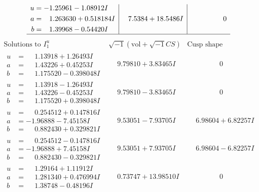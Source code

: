 \documentclass[1p]{elsarticle_modified}
\theoremstyle{definition}
\newcommand{\I}{\sqrt{-1}}
\begin{document}
$$\begin{array}{c|c|c}
\begin{aligned}
u &= -1.25961 - 1.08912 I \\
a &= \phantom{-}1.263630 + 0.518184 I \\
b &= \phantom{-}1.39968 - 0.54420 I\end{aligned}
 & \phantom{-}7.5384 + 18.5486 I & \phantom{-0.000000 } 0\\
 \hline 
 \end{array}$$\newpage$$\begin{array}{c|c|c}  
\text{Solutions to }I^u_{1}& \I (\text{vol} + \sqrt{-1}CS) & \text{Cusp shape}\\
 \hline 
\begin{aligned}
u &= \phantom{-}1.13918 + 1.26493 I \\
a &= \phantom{-}1.43226 + 0.45253 I \\
b &= \phantom{-}1.175520 - 0.398048 I\end{aligned}
 & \phantom{-}9.79810 + 3.83465 I & \phantom{-0.000000 } 0 \\ \hline\begin{aligned}
u &= \phantom{-}1.13918 - 1.26493 I \\
a &= \phantom{-}1.43226 - 0.45253 I \\
b &= \phantom{-}1.175520 + 0.398048 I\end{aligned}
 & \phantom{-}9.79810 - 3.83465 I & \phantom{-0.000000 } 0 \\ \hline\begin{aligned}
u &= \phantom{-}0.254512 + 0.147816 I \\
a &= -1.96888 - 7.45158 I \\
b &= \phantom{-}0.882430 + 0.329821 I\end{aligned}
 & \phantom{-}9.53051 - 7.93705 I & \phantom{-}6.98604 + 6.82257 I \\ \hline\begin{aligned}
u &= \phantom{-}0.254512 - 0.147816 I \\
a &= -1.96888 + 7.45158 I \\
b &= \phantom{-}0.882430 - 0.329821 I\end{aligned}
 & \phantom{-}9.53051 + 7.93705 I & \phantom{-}6.98604 - 6.82257 I \\ \hline\begin{aligned}
u &= \phantom{-}1.29164 + 1.11912 I \\
a &= \phantom{-}1.281340 + 0.476994 I \\
b &= \phantom{-}1.38748 - 0.48196 I\end{aligned}
 & \phantom{-}0.73747 + 13.98510 I & \phantom{-0.000000 } 0 \\ \hline\begin{aligned}

\end{aligned}
\end{array}$$
\end{document}
